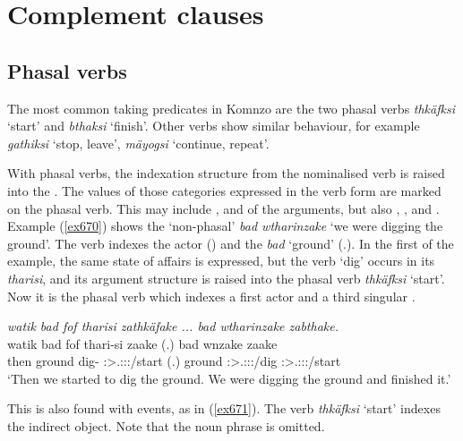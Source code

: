 \section{Complement clauses}\label{complementclauses}

\subsection{Phasal verbs}\label{phasalcomplements}

The most common  taking predicates in Komnzo are the two phasal verbs \emph{thkäfksi} `start' and \emph{bthaksi} `finish'. Other verbs show similar behaviour, for example \emph{gathiksi} `stop, leave', \emph{mäyogsi} `continue, repeat'.

With phasal verbs, the indexation structure from the nominalised verb is raised into the . The values of those categories expressed in the verb form are marked on the phasal verb. This may include ,  and  of the arguments, but also , ,  and . Example (\ref{ex670}) shows the `non-phasal'  \emph{bad wtharinzake} `we were digging the ground'. The verb indexes the actor (\Fpl) and the  \emph{bad} `ground' (\Tsg.\F). In the first  of the example, the same state of affairs is expressed, but the verb `dig' occurs in its  \emph{tharisi}, and its argument structure is raised into the phasal verb \emph{thkäfksi} `start'. Now it is the phasal verb which indexes a first  actor and a third singular  .

\begin{exe}
	\ex \emph{watik bad fof tharisi zathkäfake ... bad wtharinzake zabthake.}\\
	\gll watik bad fof thari-si zaake (.) bad wnzake zaake\\
	then ground {\Emph} dig-{\Nmlz} \Fpl:\Sbj>\Tsg.\F:\Obj:\Pst:\Pfv/start (.) ground \Fpl:\Sbj>\Tsg.\F:\Obj:\Pst:\Ipfv/dig \Fpl:\Sbj>\Tsg.\F:\Obj:\Pst:\Pfv/start\\
	\trans `Then we started to dig the ground. We were digging the ground and finished it.'\\
	\label{ex670}
\end{exe}

This is also found with  events, as in (\ref{ex671}). The verb \emph{thkäfksi} `start' indexes the indirect object. Note that the  noun phrase is omitted.

